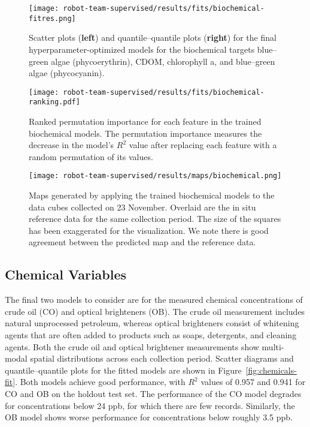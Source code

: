 \newpage

\begin{figure}[H]
  \centering
  \texttt{[image: robot-team-supervised/results/fits/biochemical-fitres.png]}
  \caption{Scatter plots (\textbf{left}) and quantile--quantile plots
    (\textbf{right}) for the final hyperparameter-optimized models for the
    biochemical targets blue--green algae (phycoerythrin), CDOM, chlorophyll a,
    and blue--green algae (phycocyanin). \label{fig:biochem-fit}}
\end{figure}

\begin{figure}[H]
  \centering
  \texttt{[image: robot-team-supervised/results/fits/biochemical-ranking.pdf]}
  \caption{Ranked permutation importance for each feature in the trained
    biochemical models. The permutation importance measures the decrease in the
    model's $R^2$ value after replacing each feature with a random permutation
    of its values.\label{fig:biochem-fi}}
\end{figure}

\begin{figure}[H]
  \centering
  \texttt{[image: robot-team-supervised/results/maps/biochemical.png]}
  \caption{Maps generated by applying the trained biochemical models to the data
  cubes collected on 23 November. Overlaid are the in situ reference data for
  the same collection period. The size of the squares has been exaggerated for
  the visualization. We note there is good agreement between the predicted map
  and the reference data. \label{fig:map-biochem}}
\end{figure}

\newpage

\subsection{Chemical Variables}

The final two models to consider are for the measured chemical concentrations of crude oil (CO) and optical brighteners (OB). The crude oil measurement includes natural unprocessed petroleum, whereas optical brighteners consist of whitening agents that are often added to products such as soaps, detergents, and cleaning agents. Both the crude oil and optical brightener measurements show multi-modal spatial distributions across each collection period. Scatter diagrams and quantile--quantile plots for the fitted models are shown in Figure~\ref{fig:chemicals-fit}. Both models achieve good performance, with $R^2$ values of 0.957 and 0.941 for CO and OB on the holdout test set. The performance of the CO model degrades for concentrations below 24 ppb, for which there are few records. Similarly, the OB model shows worse performance for concentrations below roughly 3.5 ppb.

